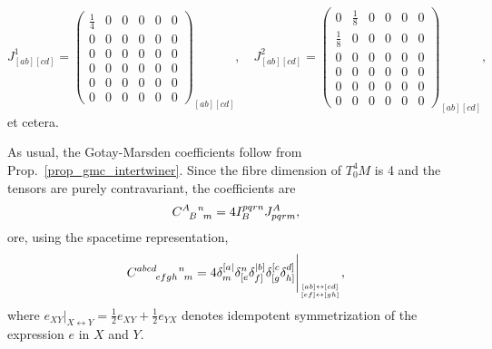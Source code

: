 \begin{equation}
  J_{[ab][cd]}^1 = \begin{pmatrix} \frac{1}{4} & 0 & 0 & 0 & 0 & 0 \\ 0 & 0 & 0 & 0 & 0 & 0 \\ 0 & 0 & 0 & 0 & 0 & 0 \\ 0 & 0 & 0 & 0 & 0 & 0 \\ 0 & 0 & 0 & 0 & 0 & 0 \\ 0 & 0 & 0 & 0 & 0 & 0 \end{pmatrix}_{[ab][cd]},\quad
  J_{[ab][cd]}^2 = \begin{pmatrix} 0 & \frac{1}{8} & 0 & 0 & 0 & 0 \\ \frac{1}{8} & 0 & 0 & 0 & 0 & 0 \\ 0 & 0 & 0 & 0 & 0 & 0 \\ 0 & 0 & 0 & 0 & 0 & 0 \\ 0 & 0 & 0 & 0 & 0 & 0 \\ 0 & 0 & 0 & 0 & 0 & 0 \end{pmatrix}_{[ab][cd]},
\end{equation}
et cetera.

As usual, the Gotay-Marsden coefficients follow from Prop.\ \ref{prop_gmc_intertwiner}. Since the fibre dimension of $T^4_0M$ is 4 and the tensors are purely contravariant, the coefficients are
\begin{equation}
  \gmc{A}{B}{n}{m} = 4 I^{pqrn}_B J^A_{pqrm},
\end{equation}
ore, using the spacetime representation,
\begin{equation}
\gmc{abcd}{efgh}{n}{m} = 4 \delta^{[a\mid}_{\vphantom{f}m} \delta^{n}_{[e} \delta^{\mid b]}_{f]} \delta^{[c}_{[g} \delta^{d]}_{h]} \Bigg\rvert_{[ab] \leftrightarrow [cd]\atop [ef] \leftrightarrow [gh]},
\end{equation}
where $e_{XY} \big\rvert_{X \leftrightarrow Y} = \frac{1}{2} e_{XY} + \frac{1}{2} e_{YX}$ denotes idempotent symmetrization of the expression $e$ in $X$ and $Y$.

